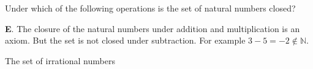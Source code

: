 \documentclass[addpoints]{exam}
\begin{document}
\begin{questions}
\question[2] Under which of the following operations is the set of natural numbers closed? 

		\begin{solution}
			\textbf{E}. The closure of the natural numbers under addition and multiplication is an axiom. But the set is not closed under subtraction. For example $3 - 5 = -2 \not \in \mathbb{N}$. 
		\end{solution}

\question[2] The set of irrational numbers 
	

\end{questions}
\end{document}
